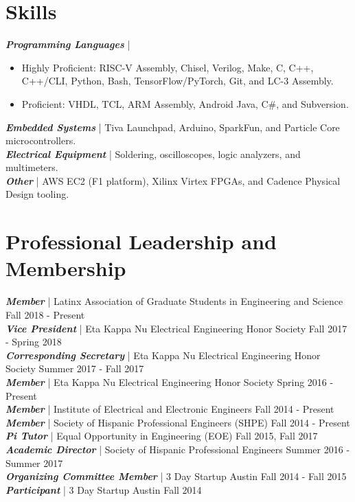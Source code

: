 \documentclass[letter]{res}
\begin{document}
\begin{resume}
\vspace{-2mm}

\section{Skills}
{\sl \textbf{Programming Languages}} |
\begin{itemize}
 \item Highly Proficient: RISC-V Assembly, Chisel, Verilog, Make, C, C++, C++/CLI, Python, Bash, TensorFlow/PyTorch, Git, and LC-3 Assembly.
 \item Proficient: VHDL, TCL, ARM Assembly, Android Java, C\#, and Subversion.
\end{itemize}
 \vspace{-4mm}
{\sl \textbf{Embedded Systems}} | Tiva Launchpad, Arduino, SparkFun, and Particle Core microcontrollers.\\
{\sl \textbf{Electrical Equipment}} | Soldering, oscilloscopes, logic analyzers, and multimeters.\\
{\sl \textbf{Other}} | AWS EC2 (F1 platform), Xilinx Virtex FPGAs, and Cadence Physical Design tooling.\\

\vspace{-6mm}

\section{Professional Leadership and Membership}
{\sl \textbf{Member}} | Latinx Association of Graduate Students in Engineering and Science \hfill Fall 2018 - Present\\
{\sl \textbf{Vice President}} | Eta Kappa Nu Electrical Engineering Honor Society \hfill Fall 2017 - Spring 2018\\
{\sl \textbf{Corresponding Secretary}} | Eta Kappa Nu Electrical Engineering Honor Society \hfill Summer 2017 - Fall 2017\\
{\sl \textbf{Member}} | Eta Kappa Nu Electrical Engineering Honor Society \hfill Spring 2016 - Present\\
{\sl \textbf{Member}} | Institute of Electrical and Electronic Engineers \hfill Fall 2014 - Present\\
{\sl \textbf{Member}} | Society of Hispanic Professional Engineers (SHPE) \hfill Fall 2014 - Present\\
{\sl \textbf{Pi Tutor}} | Equal Opportunity in Engineering (EOE) \hfill Fall 2015, Fall 2017\\
{\sl \textbf{Academic Director}} | Society of Hispanic Professional Engineers \hfill Summer 2016 - Summer 2017\\
{\sl \textbf{Organizing Committee Member}} | 3 Day Startup Austin \hfill Fall 2014 - Fall 2015\\
{\sl \textbf{Participant}} | 3 Day Startup Austin \hfill Fall 2014\\


\end{resume}
\end{document}
